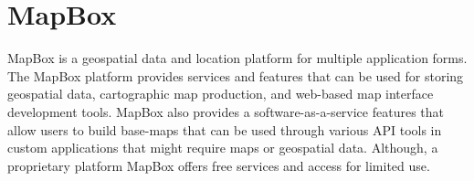 \section{MapBox}

MapBox is a geospatial data and location platform for multiple application
forms.  The MapBox platform provides services and features that can be used for
storing geospatial data, cartographic map production, and web-based map
interface development tools.  MapBox also provides a software-as-a-service
features that allow users to build base-maps that can be used through various
API tools in custom applications that might require maps or geospatial
data.  Although, a proprietary platform MapBox offers free services and access
for limited use\cite{hid-sp18-505-MapBox2018}.
